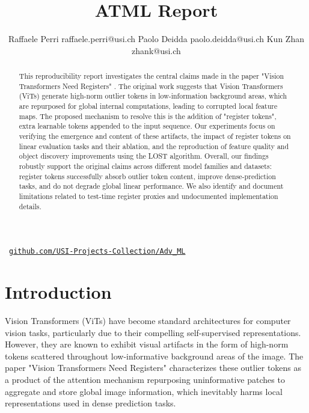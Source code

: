 \documentclass[10pt]{article} %
\title{ATML Report}
\author{%
  \name Raffaele Perri \email raffaele.perri@usi.ch
  \AND
  \name Paolo Deidda \email paolo.deidda@usi.ch
  \AND
  \name Kun Zhan \email zhank@usi.ch
}
\begin{document}
\maketitle

\faGithub\ \href{https://github.com/USI-Projects-Collection/Adv_ML}{\texttt{github.com/USI-Projects-Collection/Adv\_ML}}
\vspace{0.5cm}

\begin{abstract}
 This reproducibility report investigates the central claims made in the paper "Vision Transformers Need Registers" \citep{darcet2024vision}. The original work suggests that Vision Transformers (ViTs) generate high-norm outlier tokens in low-information background areas, which are repurposed for global internal computations, leading to corrupted local feature maps. The proposed mechanism to resolve this is the addition of "register tokens", extra learnable tokens appended to the input sequence. Our experiments focus on verifying the emergence and content of these artifacts, the impact of register tokens on linear evaluation tasks and their ablation, and the reproduction of feature quality and object discovery improvements using the LOST algorithm. Overall, our findings robustly support the original claims across different model families and datasets: register tokens successfully absorb outlier token content, improve dense-prediction tasks, and do not degrade global linear performance. We also identify and document limitations related to test-time register proxies and undocumented implementation details.
\end{abstract}

\setcounter{tocdepth}{2}
{\setlength{\parskip}{0pt}\linespread{0.9}\selectfont
\tableofcontents
\par}

\newpage

\section{Introduction}
Vision Transformers (ViTs) have become standard architectures for computer vision tasks, particularly due to their compelling self-supervised representations. However, they are known to exhibit visual artifacts in the form of high-norm tokens scattered throughout low-informative background areas of the image. The paper "Vision Transformers Need Registers" \citep{darcet2024vision} characterizes these outlier tokens as a product of the attention mechanism repurposing uninformative patches to aggregate and store global image information, which inevitably harms local representations used in dense prediction tasks. 
\end{document}
